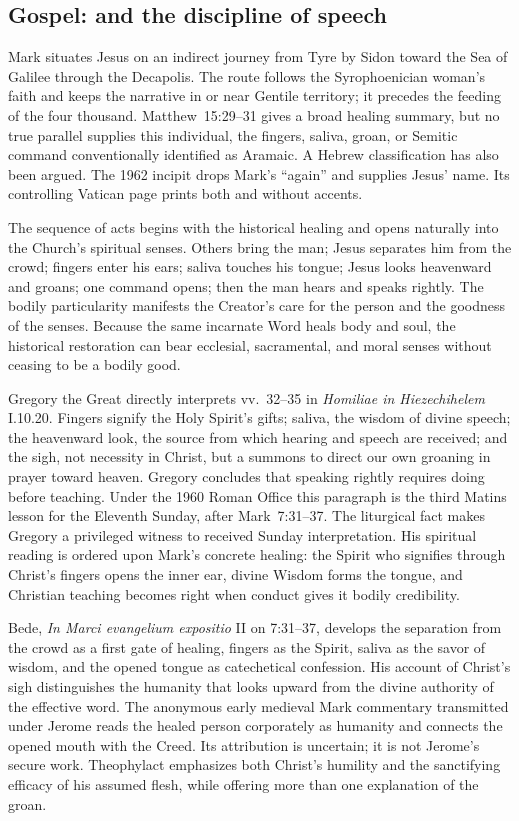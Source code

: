 \subsection*{Gospel:  and the discipline of speech\enspace{}}

Mark situates Jesus on an indirect journey from Tyre by Sidon toward the Sea
of Galilee through the Decapolis. The route follows the Syrophoenician woman's
faith and keeps the narrative in or near Gentile territory; it precedes the
feeding of the four thousand. Matthew~15:29--31 gives a broad healing summary,
but no true parallel supplies this individual, the fingers, saliva, groan, or
Semitic command conventionally identified as Aramaic. A Hebrew classification
has also been argued. The 1962 incipit drops Mark's ``again'' and supplies Jesus'
name. Its controlling Vatican page prints both  and
 without accents.

The sequence of acts begins with the historical healing and opens naturally
into the Church's spiritual senses. Others bring the man;
Jesus separates him from the crowd; fingers enter his ears; saliva touches
his tongue; Jesus looks heavenward and groans; one command opens; then the
man hears and speaks rightly. The bodily particularity manifests the Creator's
care for the person and the goodness of the senses. Because the same incarnate
Word heals body and soul, the historical restoration can bear ecclesial,
sacramental, and moral senses without ceasing to be a bodily good.

Gregory the Great directly interprets vv.~32--35 in \emph{Homiliae in
Hiezechihelem} I.10.20. Fingers signify the Holy Spirit's gifts; saliva, the
wisdom of divine speech; the heavenward look, the source from which hearing
and speech are received; and the sigh, not necessity in Christ, but a summons
to direct our own groaning in prayer toward heaven. Gregory concludes that speaking rightly requires doing before
teaching. Under the 1960 Roman Office this paragraph is the third Matins
lesson for the Eleventh Sunday, after Mark~7:31--37. The liturgical fact makes
Gregory a privileged witness to received Sunday interpretation. His spiritual
reading is ordered upon Mark's concrete healing: the Spirit who signifies
through Christ's fingers opens the inner ear, divine Wisdom forms the tongue,
and Christian teaching becomes right when conduct gives it bodily credibility.

Bede, \emph{In Marci evangelium expositio} II on 7:31--37, develops the
separation from the crowd as a first gate of healing, fingers as the Spirit,
saliva as the savor of wisdom, and the opened tongue as catechetical
confession. His account of Christ's sigh distinguishes the humanity that
looks upward from the divine authority of the effective word. The anonymous
early medieval Mark commentary transmitted under Jerome reads the healed
person corporately as humanity and connects the opened mouth with the Creed.
Its attribution is uncertain; it is not Jerome's secure work.
Theophylact emphasizes both Christ's humility and the sanctifying efficacy of
his assumed flesh, while offering more than one explanation of the groan.

